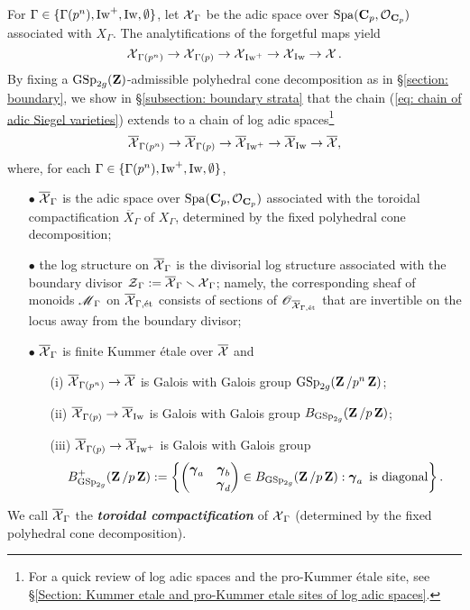 For $\Gamma \in \{\Gamma(p^n), \Iw^+, \Iw, \emptyset\}$, let $\calX_{\Gamma}$ be the adic space over $\Spa(\C_p, \calO_{\C_p})$ associated with $X_{\Gamma}$. The analytifications of the forgetful maps yield 
\begin{equation}\label{eq: chain of adic Siegel varieties}
    \calX_{\Gamma(p^n)} \rightarrow \calX_{\Gamma(p)} \rightarrow \calX_{\Iw^+} \rightarrow \calX_{\Iw} \rightarrow \calX.
\end{equation} By fixing a $\GSp_{2g}(\Z)$-admissible polyhedral cone decomposition as in \S \ref{section: boundary}, we show in \S \ref{subsection: boundary strata} that the chain (\ref{eq: chain of adic Siegel varieties}) extends to a chain of log adic spaces\footnote{For a quick review of log adic spaces and the pro-Kummer \'etale site, see \S \ref{Section: Kummer etale and pro-Kummer etale sites of log adic spaces}.} \[
    \overline{\calX}_{\Gamma(p^n)} \rightarrow \overline{\calX}_{\Gamma(p)} \rightarrow \overline{\calX}_{\Iw^+} \rightarrow \overline{\calX}_{\Iw} \rightarrow \overline{\calX},
\] where, for each $\Gamma \in \{\Gamma(p^n), \Iw^+, \Iw, \emptyset\}$, 
\begin{enumerate}
    \item[$\bullet$] $\overline{\calX}_{\Gamma}$ is the adic space over $\Spa(\C_p, \calO_{\C_p})$ associated with the toroidal compactification $\overline{X}_{\Gamma}$ of $X_{\Gamma}$, determined by the fixed polyhedral cone decomposition; 
    \item[$\bullet$] the log structure on $\overline{\calX}_{\Gamma}$ is the divisorial log structure associated with the boundary divisor $\calZ_{\Gamma} := \overline{\calX}_{\Gamma}\smallsetminus \calX_{\Gamma}$; namely, the corresponding sheaf of monoids $\scrM_{\Gamma}$ on $\overline{\calX}_{\Gamma, \et}$ consists of sections of $\scrO_{\overline{\calX}_{\Gamma,\et}}$ that are invertible on the locus away from the boundary divisor;
    \item[$\bullet$] $\overline{\calX}_{\Gamma}$ is finite Kummer \'etale over $\overline{\calX}$ and \begin{enumerate}
        \item[(i)] $\overline{\calX}_{\Gamma(p^n)}\rightarrow \overline{\calX}$ is Galois with Galois group $\GSp_{2g}(\Z/p^n\Z)$;
        \item[(ii)] $\overline{\calX}_{\Gamma(p)}\rightarrow \overline{\calX}_{\Iw}$ is Galois with Galois group $B_{\GSp_{2g}}(\Z/p\Z)$;
        \item[(iii)] $\overline{\calX}_{\Gamma(p)} \rightarrow \overline{\calX}_{\Iw^+}$ is Galois with Galois group $$B^+_{\GSp_{2g}}(\Z/p\Z) := \left\{\begin{pmatrix}\bfgamma_a &\bfgamma_b\\ &\bfgamma_d\end{pmatrix}\in B_{\GSp_{2g}}(\Z/p\Z): \bfgamma_a\text{ is diagonal}\right\}.$$
    \end{enumerate}
\end{enumerate}
We call $\overline{\calX}_{\Gamma}$ the \textbf{\textit{toroidal compactification}} of $\calX_{\Gamma}$ (determined by the fixed polyhedral cone decomposition). 

